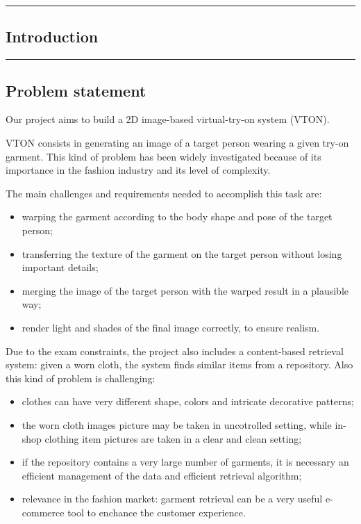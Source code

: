 \tableofcontents

\hfill

{\color{gray}\hrule}
\begin{center}
\section{Introduction}
\end{center}
{\color{gray}\hrule}

\hfill

\subsection{Problem statement}
Our project aims to build a 2D image-based virtual-try-on system (VTON).

VTON consists in generating an image of a target person wearing a given try-on garment. This kind of problem has been widely investigated because of its importance in the fashion industry and its level of complexity.

The main challenges and requirements \cite{CP-VTON} needed to accomplish this task are:
\begin{itemize}[noitemsep]
\item warping the garment according to the body shape and pose of the target person;
\item transferring the texture of the garment on the target person without losing important details; 
\item merging the image of the target person with the warped result in a plausible way; 
\item render light and shades of the final image correctly, to ensure realism.
\end{itemize}
Due to the exam constraints, the project also includes a content-based retrieval system: given a worn cloth, the system finds similar items from a repository. Also this kind of problem is challenging: 
\begin{itemize}[noitemsep]
\item clothes can have very different shape, colors and intricate decorative patterns;
\item the worn cloth images picture may be taken in uncotrolled setting, while in-shop clothing item pictures are taken in a clear and clean setting;
\item if the repository contains a very large number of garments, it is necessary an efficient management of the data and efficient retrieval algorithm;
\item relevance in the fashion market: garment retrieval can be a very useful e-commerce tool to enchance the customer experience.
\end{itemize}



